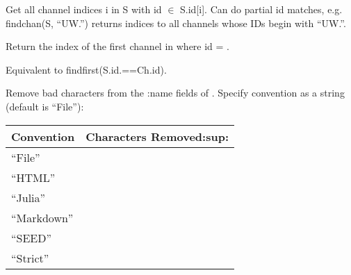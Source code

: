 \documentclass[letterpaper,11pt,english]{sphinxmanual}
\begin{document}
\begin{fulllineitems}
\end{fulllineitems}


Get all channel indices i in S with id \(\in\) S.id{[}i{]}. Can do partial id matches, e.g. findchan(S, “UW.”) returns indices to all channels whose IDs begin with “UW.”.

\begin{fulllineitems}
\label{\detokenize{src/working_with_data:findid}}
\end{fulllineitems}


Return the index of the first channel in  where id = .

\begin{fulllineitems}
\end{fulllineitems}


Equivalent to findfirst(S.id.==Ch.id).


\begin{fulllineitems}
\end{fulllineitems}


Remove bad characters from the :name fields of . Specify convention as a string (default is “File”):


\begin{savenotes}\sphinxattablestart
\centering
\begin{tabulary}{\linewidth}[t]{|T|T|}
\hline
\sphinxstyletheadfamily 
Convention
&\sphinxstyletheadfamily 
Characters Removed:sup:
\\
\hline
“File”
&
\\
\hline
“HTML”
&
\\
\hline
“Julia”
&
\\
\hline
“Markdown”
&
\\
\hline
“SEED”
&
\\
\hline
“Strict”
&
\\
\hline
\end{tabulary}
\par
\sphinxattableend\end{savenotes}
\end{document}
